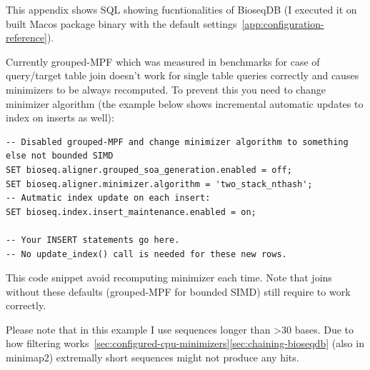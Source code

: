 \label{app:sql-walkthrough}

This appendix shows SQL showing fucntionalities of BioseqDB (I executed it on built Macos package binary with the default settings~\ref{app:configuration-reference}).


Currently grouped-MPF which was measured in benchmarks for case of query/target table join doesn't work for single table queries correctly and causes minimizers to be always recomputed.
To prevent this you need to change minimizer algorithm (the example below shows incremental automatic updates to index on inserts as well):

\noindent\begin{minipage}{\linewidth}
\begin{lstlisting}[style=bioseq-search-sql,caption={How to avoid index-read bug (always recompute minimizers)},label={lst:sql-index-read-bug-recompute}]
-- Disabled grouped-MPF and change minimizer algorithm to something else not bounded SIMD
SET bioseq.aligner.grouped_soa_generation.enabled = off;
SET bioseq.aligner.minimizer.algorithm = 'two_stack_nthash';
-- Autmatic index update on each insert:
SET bioseq.index.insert_maintenance.enabled = on;

-- Your INSERT statements go here.
-- No update_index() call is needed for these new rows.
\end{lstlisting}
\end{minipage}

This code snippet avoid recomputing minimizer each time. Note that joins without these defaults (grouped-MPF for bounded SIMD) still require  to work correctly.


Please note that in this example I use sequences longer than >30 bases. Due to how filtering works~\ref{sec:configured-cpu-minimizers}\ref{sec:chaining-bioseqdb} (also in minimap2) extremally short sequences might not produce any hits.
